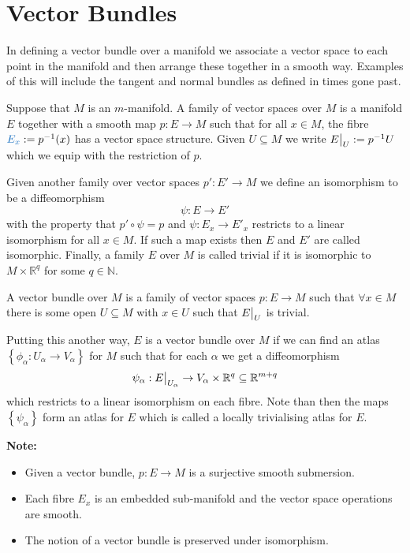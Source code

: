 \documentclass[11pt]{article}
\newcommand{\defeq}{:=}
\newcommand\restr[2]{{%
  \left.\kern-\nulldelimiterspace %
  #1 %
  \vphantom{\big|} %
  \right|_{#2} %
  }}
\newcommand{\R}{\mathbb{R}}
\newcommand{\N}{\mathbb{N}}
\newenvironment{defin}
	{\begin{mdframed}[backgroundcolor=white, roundcorner=5pt, linewidth=1pt, linecolor=RoyalBlue]
		\setlength{\parindent}{0pt}}
	{\end{mdframed}}
\newcommand{\mdf}[1]{{\color{RoyalBlue} #1}}
\newenvironment{note}
	{\begin{mdframed}[backgroundcolor=white, linecolor=RubineRed, roundcorner=5pt, linewidth=1pt]\bfseries{Note:}\normalfont
	\setlength{\parindent}{0pt}}
	{\end{mdframed}}
\begin{document}
\section{Vector Bundles}
In defining a vector bundle over a manifold we associate a vector space to each point in the manifold and then arrange these together in a smooth way.
Examples of this will include the tangent and normal bundles as defined in times gone past.

Suppose that $M$ is an $m$-manifold.
A \mdf{family of vector spaces} over $M$ is a manifold $E$ together with a smooth map $p:E\to M$ such that for all $x\in M$, the \mdf{fibre} $\mdf{E_x}\defeq p^{-1}(x)$ has a vector space structure.
Given $U\subseteq M$ we write $\restr{E}{U}\defeq p^{-1}U$ which we equip with the restriction of $p$.

Given another family over vector spaces $p':E'\to M$ we define an \mdf{isomorphism} to be a diffeomorphism 
\[
\psi:E\to E'
\]
with the property that $p'\circ\psi = p$ and $\psi:E_x\to E'_x$ restricts to  a linear isomorphism for all $x\in M$.
If such a map exists then $E$ and $E'$ are called \mdf{isomorphic}.
Finally, a family $E$ over $M$ is called \mdf{trivial} if it is isomorphic to $M\times \R^q$ for some $q\in\N$.

\begin{figure}[H]
	\centering
\end{figure}

\begin{defin}
	A \mdf{vector bundle} over $M$ is a family of vector spaces $p:E\to M$ such that $\forall x\in M$ there is some open $U\subseteq M$ with $x\in U$ such that $\restr{E}{U}$ is trivial.
\end{defin}

Putting this another way, $E$ is a vector bundle over $M$ if we can find an atlas $\left\{\phi_\alpha : U_\alpha \to V_\alpha \right\}$ for $M$ such that for each $\alpha$ we get a diffeomorphism
\[
	\psi_\alpha: \restr{E}{U_\alpha}\to V_\alpha\times\R^q\subseteq\R^{m+q}
\]
which restricts to a linear isomorphism on each fibre.
Note than then the maps $\left\{\psi_\alpha\right\}$ form an atlas for $E$ which is called a \mdf{locally trivialising atlas} for $E$.
\begin{note}
	\begin{itemize}
		\item Given a vector bundle, $p:E\to M$ is a surjective smooth submersion.
		\item Each fibre $E_x$ is an embedded sub-manifold and the vector space operations are smooth.
		\item The notion of a vector bundle is preserved under isomorphism.
	\end{itemize}
\end{note}
\end{document}
